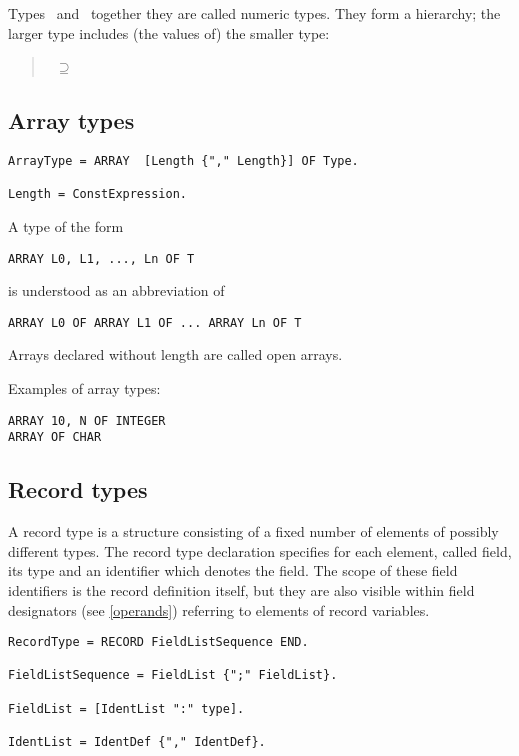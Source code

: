 \documentclass[12pt]{article}
\begin{document}
Types \INTEGER\ and \REAL\ together they are called numeric types. They form a hierarchy; the larger type includes (the values of) the smaller type:
\begin{quote}
    \REAL\ $\supseteq$ \INTEGER\
\end{quote}

\subsection{Array types}

\begin{lstlisting}[style=ebnf]
ArrayType = ARRAY  [Length {"," Length}] OF Type.

Length = ConstExpression.
\end{lstlisting}

A type of the form
\begin{lstlisting}[style=example]
ARRAY L0, L1, ..., Ln OF T
\end{lstlisting}
is understood as an abbreviation of
\begin{lstlisting}[style=example]
ARRAY L0 OF ARRAY L1 OF ... ARRAY Ln OF T
\end{lstlisting}

Arrays declared without length are called open arrays.

Examples of array types:
\begin{lstlisting}[style=example]
ARRAY 10, N OF INTEGER
ARRAY OF CHAR 
\end{lstlisting}

\subsection{Record types}
\label{records}
A record type is a structure consisting of a fixed number of elements of possibly different types. The record type declaration specifies for each element, called field, its type and an identifier which denotes the field. The scope of these field identifiers is the record definition itself, but they are also visible within field designators (see \ref{operands}) referring to elements of record variables.

\begin{lstlisting}[style=ebnf]
RecordType = RECORD FieldListSequence END.

FieldListSequence = FieldList {";" FieldList}.

FieldList = [IdentList ":" type].

IdentList = IdentDef {"," IdentDef}.
\end{lstlisting}
\end{document}
